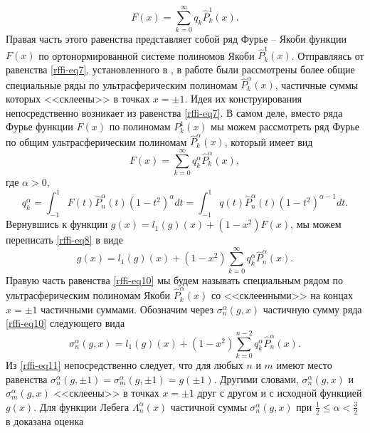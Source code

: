 \begin{equation}\label{rffi-eq7}
F(x)=\sum_{k=0}^\infty q_k\hat P_k^1(x).
\end{equation}
Правая часть этого равенства представляет собой ряд Фурье -- Якоби функции $F(x)$ по ортонормированной системе полиномов Якоби
$\hat P_k^1(x)$. Отправляясь от равенства \eqref{rffi-eq7}, установленного в \cite{rffi-13}, в работе \cite{rffi-14} были рассмотрены более общие специальные ряды  по ультрасферическим полиномам $\hat P_k^\alpha(x)$, частичные суммы которых <<склеены>> в точках $x=\pm1$.
Идея их конструирования непосредственно возникает из равенства \eqref{rffi-eq7}. В самом деле, вместо ряда Фурье функции $F(x)$ по полиномам  $P_k^1(x)$ мы можем рассмотреть  ряд Фурье по общим ультрасферическим полиномам $\hat P_k^\alpha(x)$, который имеет вид
\begin{equation}\label{rffi-eq8}
F(x)=\sum_{k=0}^\infty q_k^\alpha\hat P_k^\alpha(x),
\end{equation}
где $\alpha>0$,
\begin{equation}\label{rffi-eq9}
q_k^\alpha=\int_{-1}^1 F(t)\hat P_n^\alpha(t)(1-t^2)^\alpha dt=\int_{-1}^1 q(t)\hat P_n^\alpha(t)(1-t^2)^{\alpha-1} dt.
\end{equation}
Вернувшись к функции $g(x)=l_1(g)(x)+(1-x^2)F(x)$, мы можем переписать \eqref{rffi-eq8} в виде
\begin{equation}\label{rffi-eq10}
g(x)= l_1(g)(x)+(1-x^2)\sum_{k=0}^\infty q_k^\alpha\hat P_n^{\alpha}(x).
\end{equation}
Правую часть равенства \eqref{rffi-eq10} мы будем называть специальным рядом по ультрасферическим полиномам Якоби  $\hat P_k^\alpha(x)$ со  <<склеенными>> на концах $x=\pm1$ частичными суммами. Обозначим через $\sigma_n^\alpha(g,x)$ частичную сумму ряда \eqref{rffi-eq10} следующего вида
\begin{equation}\label{rffi-eq11}
\sigma_n^\alpha(g,x)=l_1(g)(x)+(1-x^2)\sum_{k=0}^{n-2} q_k^\alpha\hat P_n^{\alpha}(x).
\end{equation}
Из \eqref{rffi-eq11} непосредственно следует, что для любых $n$ и $m$ имеют место равенства $\sigma_n^\alpha(g,\pm1)=\sigma_m^\alpha(g,\pm1)=g(\pm1)$. Другими словами, $\sigma_n^\alpha(g,x)$ и $\sigma_m^\alpha(g,x)$
<<склеены>> в точках    $x=\pm1$ друг с другом и с исходной функцией $g(x)$. %
Для функции Лебега $\Lambda_n^\alpha(x)$ частичной суммы $\sigma_n^\alpha(g,x)$ при $\frac12\le \alpha<\frac32$ в \cite{rffi-14} доказана оценка
